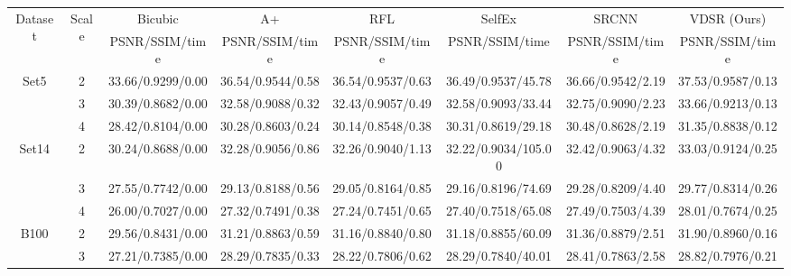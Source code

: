 \documentclass[10pt,twocolumn,letterpaper]{article}
\begin{document}
\begin{table*}
\begin{center}
\setlength{\tabcolsep}{2pt}
\small
\begin{tabular}{ | c | c | c | c | c | c | c | c | }
\hline
\multirow{2}{*}{Dataset} & \multirow{2}{*}{Scale} & Bicubic & A+ \cite{Timofte} & RFL \cite{schulter2015fast} & SelfEx \cite{Huang-CVPR-2015} & SRCNN \cite{Dong2014} & VDSR (Ours)\\
 & & PSNR/SSIM/time & PSNR/SSIM/time & PSNR/SSIM/time & PSNR/SSIM/time & PSNR/SSIM/time & PSNR/SSIM/time\\
\hline
\hline
\multirow{3}{*}{Set5} & 2 & 33.66/0.9299/0.00 & 36.54/{\color{blue}0.9544}/{\color{blue}0.58} & 36.54/0.9537/0.63 & 36.49/0.9537/45.78 & {\color{blue}36.66}/0.9542/2.19 & {\color{red}37.53}/{\color{red}0.9587}/{\color{red}0.13}\\
 & 3 & 30.39/0.8682/0.00 & 32.58/0.9088/{\color{blue}0.32} & 32.43/0.9057/0.49 & 32.58/{\color{blue}0.9093}/33.44 & {\color{blue}32.75}/0.9090/2.23 & {\color{red}33.66}/{\color{red}0.9213}/{\color{red}0.13}\\
 & 4 & 28.42/0.8104/0.00 & 30.28/0.8603/{\color{blue}0.24} & 30.14/0.8548/0.38 & 30.31/0.8619/29.18 & {\color{blue}30.48}/{\color{blue}0.8628}/2.19 & {\color{red}31.35}/{\color{red}0.8838}/{\color{red}0.12}\\
\hline
\hline
\multirow{3}{*}{Set14} & 2 & 30.24/0.8688/0.00 & 32.28/0.9056/{\color{blue}0.86} & 32.26/0.9040/1.13 & 32.22/0.9034/105.00 & {\color{blue}32.42}/{\color{blue}0.9063}/4.32 & {\color{red}33.03}/{\color{red}0.9124}/{\color{red}0.25}\\
 & 3 & 27.55/0.7742/0.00 & 29.13/0.8188/{\color{blue}0.56} & 29.05/0.8164/0.85 & 29.16/0.8196/74.69 & {\color{blue}29.28}/{\color{blue}0.8209}/4.40 & {\color{red}29.77}/{\color{red}0.8314}/{\color{red}0.26}\\
 & 4 & 26.00/0.7027/0.00 & 27.32/0.7491/{\color{blue}0.38} & 27.24/0.7451/0.65 & 27.40/{\color{blue}0.7518}/65.08 & {\color{blue}27.49}/0.7503/4.39 & {\color{red}28.01}/{\color{red}0.7674}/{\color{red}0.25}\\
\hline
\hline
\multirow{3}{*}{B100} & 2 & 29.56/0.8431/0.00 & 31.21/0.8863/{\color{blue}0.59} & 31.16/0.8840/0.80 & 31.18/0.8855/60.09 & {\color{blue}31.36}/{\color{blue}0.8879}/2.51 & {\color{red}31.90}/{\color{red}0.8960}/{\color{red}0.16}\\
 & 3 & 27.21/0.7385/0.00 & 28.29/0.7835/{\color{blue}0.33} & 28.22/0.7806/0.62 & 28.29/0.7840/40.01 & {\color{blue}28.41}/{\color{blue}0.7863}/2.58 & {\color{red}28.82}/{\color{red}0.7976}/{\color{red}0.21}\\

\end{tabular}
\end{center}
\end{table*}
\end{document}
